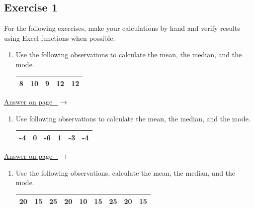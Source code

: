 \documentclass[
  11pt,
  letterpaper,
  DIV=11,
  numbers=noendperiod,
  oneside,
  open=any]{scrreprt}
\newcommand{\bsanswerref}[1]{%
  \par\nopagebreak\hypertarget{q-#1}{}\label{q-#1}%
  {\raggedleft\sffamily\footnotesize\hyperlink{a-#1}{\textcolor{bsaccent}{Answer on page \pageref{a-#1}\ $\rightarrow$}}\par}%
  \medskip}
\begin{document}
\subsection*{Exercise 1}\label{exercise-1-2}

For the following exercises, make your calculations by hand and verify
results using Excel functions when possible.

\begin{enumerate}
\def\labelenumi{\arabic{enumi}.}
\item
  Use the following observations to calculate the mean, the median, and
  the mode.

  \begin{center}
  \begin{tabular}{ccccc}
  \toprule
  8 & 10 & 9 & 12 & 12 \\
  \bottomrule
  \end{tabular}
  \end{center}
\end{enumerate}

\bsanswerref{bsans18}

\begin{enumerate}
\def\labelenumi{\arabic{enumi}.}
\setcounter{enumi}{1}
\item
  Use following observations to calculate the mean, the median, and the
  mode.

  \begin{center}
  \begin{tabular}{cccccc}
  \toprule
  -4 & 0 & -6 & 1 & -3 & -4 \\
  \bottomrule
  \end{tabular}
  \end{center}
\end{enumerate}

\bsanswerref{bsans19}

\begin{enumerate}
\def\labelenumi{\arabic{enumi}.}
\setcounter{enumi}{2}
\item
  Use the following observations, calculate the mean, the median, and
  the mode.

  \begin{center}
  \begin{tabular}{ccccccccc}
  \toprule
  20 & 15 & 25 & 20 & 10 & 15 & 25 & 20 & 15 \\
  \bottomrule
  \end{tabular}
  \end{center}
\end{enumerate}
\end{document}

